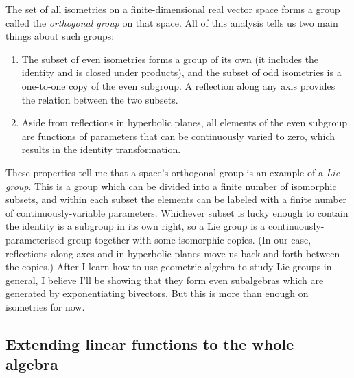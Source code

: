 \documentclass{utarticle}
\begin{document}
The set of all isometries on a finite-dimensional real vector space forms a group called the \emph{orthogonal 
group} on that space.  All of this analysis tells us two main things about such groups:
\begin{enumerate}
\item The subset of even isometries forms a group of its own (it includes the identity and is closed
          under products), and the subset of odd isometries is a one-to-one copy of the even subgroup.  A 
          reflection along any axis provides the relation between the two subsets.
\item Aside from reflections in hyperbolic planes, all elements of the even subgroup are functions of 
          parameters that can be continuously varied to zero, which results in the identity transformation.
\end{enumerate}
These properties tell me that a space's orthogonal group is an example of a \emph{Lie group}.  This is a
group which can be divided into a finite number of isomorphic subsets, and within each subset the elements
can be labeled with a finite number of continuously-variable parameters.  Whichever subset is lucky enough
to contain the identity is a subgroup in its own right, so a Lie group is a continuously-parameterised group
together with some isomorphic copies.  (In our case, reflections along axes and in hyperbolic planes 
move us back and forth between the copies.)  After I learn how to use geometric algebra to study Lie groups
in general, I believe I'll be showing that they form even subalgebras which are generated by exponentiating 
bivectors.  But this is more than enough on isometries for now.

\subsection{Extending linear functions to the whole algebra}
\label{linearextensions}
\end{document}
